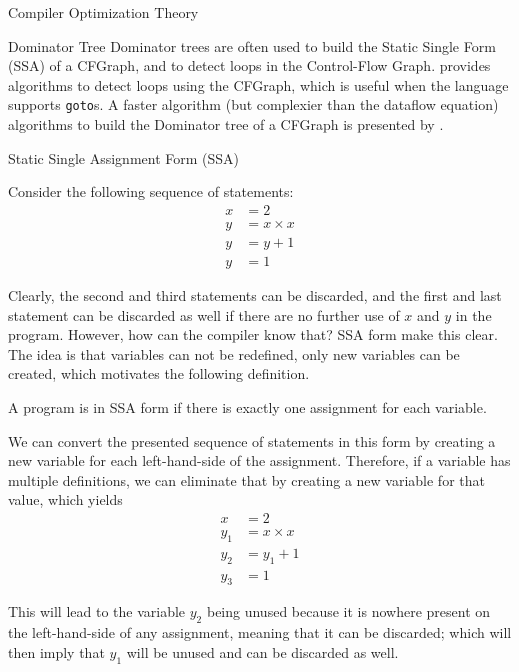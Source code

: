 \begin{section}{Compiler Optimization Theory}
\begin{subsection}{Dominator Tree}
	Dominator trees are often used to build the Static Single Form
	(SSA) of a CFGraph, and to detect loops in the Control-Flow
	Graph. \cite{appel2004modern} provides algorithms to detect
	loops using the CFGraph, which is useful when the language
	supports \texttt{goto}s. A faster algorithm
	(but complexier than the dataflow equation) algorithms to build
	the Dominator tree of a CFGraph is presented by
	\cite{georgiadis2006finding}.

\end{subsection}


\begin{subsection}{Static Single Assignment Form (SSA)}

Consider the following sequence of statements:
\begin{align}
x &= 2 \nonumber \\
y &= x \times x \nonumber \\
y &= y + 1 \nonumber \\
y &= 1 \nonumber
\end{align}

Clearly, the second and third statements can be discarded, and the first
and last statement can be discarded as well if there are no further use of $x$ and
$y$ in the program. However, how can the compiler know that? SSA form make
this clear. The idea is that variables can not be redefined, only new variables
can be created, which motivates the following definition.

\begin{definition}
	A program is in SSA form if there is exactly one assignment for each
	variable.
\end{definition}

We can convert the presented sequence of statements in this form by creating
a new variable for each left-hand-side of the assignment. Therefore, if a
variable has multiple definitions, we can eliminate that by creating a new
variable for that value, which yields
\begin{align}
x &= 2 \nonumber \\
y_1 &= x \times x \nonumber \\
y_2 &= y_1 + 1 \nonumber \\
y_3 &= 1 \nonumber
\end{align}

This will lead to the variable $y_2$ being unused because it is nowhere present
on the left-hand-side of any assignment, meaning that it can be discarded;
which will then imply that $y_1$ will be unused and can be discarded as well.


\end{subsection}
\end{section}
